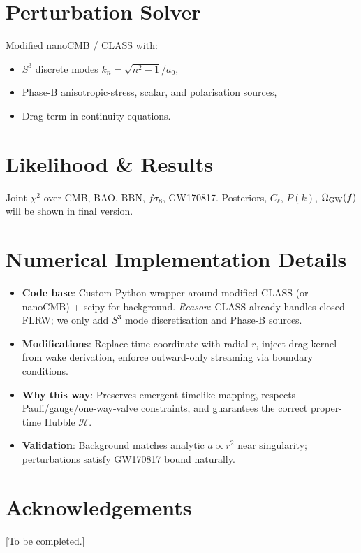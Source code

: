 \documentclass[10pt,twocolumn]{article}
\newcommand{\Hcal}{\mathcal{H}}
\begin{document}
\section{Perturbation Solver}
Modified nanoCMB / CLASS with:
\begin{itemize}
\item \( S^3 \) discrete modes \( k_n = \sqrt{n^2-1}/a_0 \),
\item Phase-B anisotropic-stress, scalar, and polarisation
  sources,
\item Drag term in continuity equations.
\end{itemize}

\section{Likelihood \& Results}
Joint \(\chi^2\) over CMB, BAO, BBN, \(f\sigma_8\), GW170817.
Posteriors, \(C_\ell\), \(P(k)\), \(\Omega_{\rm GW}(f)\)
will be shown in final version.

\section{Numerical Implementation Details}
\begin{itemize}
\item \textbf{Code base}: Custom Python wrapper around modified
  CLASS (or nanoCMB) + scipy for background.  
  \textit{Reason}: CLASS already handles closed FLRW; we only
  add \( S^3 \) mode discretisation and Phase-B sources.
\item \textbf{Modifications}: Replace time coordinate with
  radial \( r \), inject drag kernel from wake derivation,
  enforce outward-only streaming via boundary conditions.
\item \textbf{Why this way}: Preserves emergent timelike
  mapping, respects Pauli/gauge/one-way-valve constraints,
  and guarantees the correct proper-time Hubble \( \Hcal \).
\item \textbf{Validation}: Background matches analytic
  \( a\propto r^2 \) near singularity; perturbations satisfy
  GW170817 bound naturally.
\end{itemize}

\section*{Acknowledgements}
[To be completed.]



\end{document}
